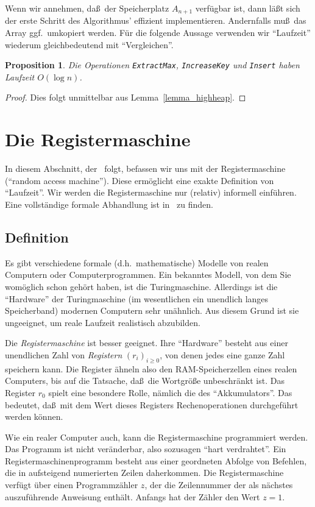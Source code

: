 \documentclass[10pt,reqno]{amsart}
\numberwithin{equation}{section}
\newtheorem{proposition}[definition]{Proposition}
\newcommand\Lem{Lemma}
\begin{document}
Wenn wir annehmen, da\ss\ der Speicherplatz $A_{n+1}$ verf\"ugbar ist, dann l\"a\ss t sich der erste Schritt des Algorithmus' effizient implementieren.
Andernfalls mu\ss\ das Array ggf.\ umkopiert werden.
F\"ur die folgende Aussage verwenden wir ``Laufzeit'' wiederum gleichbedeutend mit ``Vergleichen''.

\begin{proposition}\label{prop_priority}
	Die Operationen {\tt ExtractMax}, {\tt IncreaseKey} und {\tt Insert} haben Laufzeit $O(\log n)$.
\end{proposition}
\begin{proof}
	Dies folgt unmittelbar aus \Lem~\ref{lemma_highheap}.
\end{proof}

\section{Die Registermaschine}\label{sec_ram}
In diesem Abschnitt, der~\cite{Papadimitriou} folgt, befassen wir uns mit der Registermaschine (``random access machine'').
Diese erm\"oglicht eine exakte Definition von ``Laufzeit''.
Wir werden die Registermaschine nur (relativ) informell einf\"uhren.
Eine vollst\"andige formale Abhandlung ist in~\cite{Papadimitriou} zu finden.

\subsection{Definition}\label{sec_ram_def}
Es gibt verschiedene formale (d.h.\ mathematische) Modelle von realen Computern oder Computerprogrammen.
Ein bekanntes Modell, von dem Sie wom\"oglich schon geh\"ort haben, ist die Turingmaschine.
Allerdings ist die ``Hardware'' der Turingmaschine (im wesentlichen ein unendlich langes Speicherband) modernen Computern sehr un\"ahnlich.
Aus diesem Grund ist sie ungeeignet, um reale Laufzeit realistisch abzubilden.

Die {\em Registermaschine} ist besser geeignet.
Ihre ``Hardware'' besteht aus einer unendlichen Zahl von {\em Registern} $(r_i)_{i\geq0}$, von denen jedes eine ganze Zahl speichern kann.
Die Register \"ahneln also den RAM-Speicherzellen eines realen Computers, bis auf die Tatsache, da\ss\ die Wortgr\"o\ss e unbeschr\"ankt ist.
Das Register $r_0$ spielt eine besondere Rolle, n\"amlich die des ``Akkumulators''.
Das bedeutet, da\ss\ mit dem Wert dieses Registers Rechenoperationen durchgef\"uhrt werden k\"onnen.

Wie ein realer Computer auch, kann die Registermaschine programmiert werden.
Das Programm ist nicht ver\"anderbar, also sozusagen ``hart verdrahtet''.
Ein Registermaschinenprogramm besteht aus einer geordneten Abfolge von Befehlen, die in aufsteigend numerierten Zeilen daherkommen.
Die Registermaschine verf\"ugt \"uber einen Programmz\"ahler $z$, der die Zeilennummer der als n\"achstes auszuf\"uhrende Anweisung enth\"alt.
Anfangs hat der Z\"ahler den Wert $z=1$.
\end{document}
